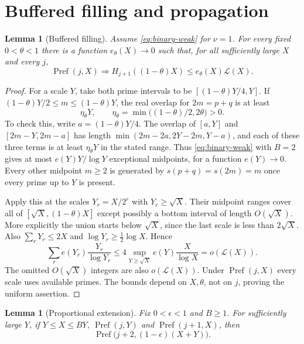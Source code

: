 \documentclass[11pt,letterpaper]{article}
\numberwithin{equation}{section}
\newtheorem{lemma}[theorem]{Lemma}
\theoremstyle{remark}
\begin{document}
\section{Buffered filling and propagation}

\begin{lemma}[Buffered filling]\label{lem:buffer}
Assume \eqref{eq:binary-weak} for $\nu=1$. For every fixed $0<\theta<1$
there is a function $e_\theta(X)\to0$ such that, for all sufficiently large
$X$ and every $j$,
\begin{equation}\label{eq:buffer}
 \operatorname{Pref}(j,X)\Longrightarrow
 H_{j+1}((1-\theta)X)\le e_\theta(X)\mathcal L(X).
\end{equation}
\end{lemma}

\begin{proof}
For a scale $Y$, take both prime intervals to be
$[(1-\theta)Y/4,Y]$. If $(1-\theta)Y/2\le m\le(1-\theta)Y$,
the real overlap for $2m=p+q$ is at least
\[
 \eta_\theta Y,\qquad
 \eta_\theta=\min\bigl((1-\theta)/2,2\theta\bigr)>0.
\]
To check this, write $a=(1-\theta)Y/4$. The overlap of
$[a,Y]$ and $[2m-Y,2m-a]$ has length
$\min(2m-2a,2Y-2m,Y-a)$, and each of these three terms is at least
$\eta_\theta Y$ in the stated range.
Thus \eqref{eq:binary-weak} with $B=2$ gives at most
$e(Y)Y/\log Y$ exceptional midpoints, for a function $e(Y)\to0$.
Every other midpoint $m\ge2$ is generated by $s(p+q)=s(2m)=m$
once every prime up to $Y$ is present.

Apply this at the scales $Y_r=X/2^r$ with $Y_r\ge\sqrt X$.
Their midpoint ranges cover all of
$[\sqrt X,(1-\theta)X]$ except possibly a bottom interval of length
$O(\sqrt X)$. More explicitly the union starts below $\sqrt X$,
since the last scale is less than $2\sqrt X$.
Also $\sum_rY_r\le2X$ and $\log Y_r\ge\tfrac12\log X$. Hence
\[
 \sum_r e(Y_r)\frac{Y_r}{\log Y_r}
 \le 4\sup_{Y\ge\sqrt X}e(Y)\frac{X}{\log X}
 =o(\mathcal L(X)).
\]
The omitted $O(\sqrt X)$ integers are also $o(\mathcal L(X))$.
Under $\operatorname{Pref}(j,X)$ every scale uses available primes.
The bounds depend on $X,\theta$, not on $j$, proving the uniform assertion.
\end{proof}

\begin{lemma}[Proportional extension]\label{lem:prop-extension}
Fix $0<\epsilon<1$ and $B\ge1$. For sufficiently large $Y$, if
$Y\le X\le BY$, $\operatorname{Pref}(j,Y)$ and
$\operatorname{Pref}(j+1,X)$, then
\begin{equation}\label{eq:prop-extension}
 \operatorname{Pref}\bigl(j+2,(1-\epsilon)(X+Y)\bigr).
\end{equation}
\end{lemma}
\end{document}

